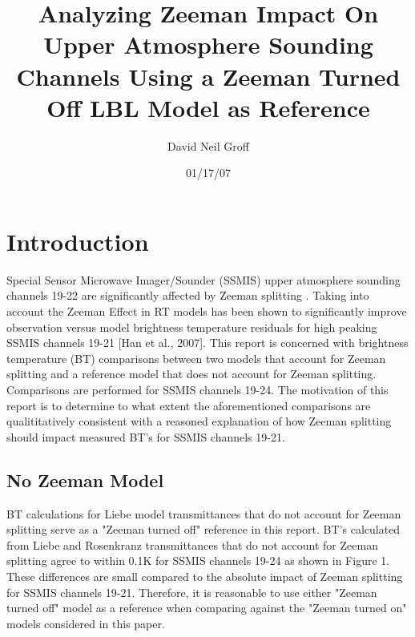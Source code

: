

\title{Analyzing Zeeman Impact On Upper Atmosphere Sounding Channels Using a Zeeman Turned Off LBL Model as Reference}
\author{David Neil Groff}
\date{01/17/07}

\newcommand{\microtesla}{\ensuremath{\mu\textrm{T}}}

\maketitle

\section{Introduction}
Special Sensor Microwave Imager/Sounder (SSMIS) upper atmosphere sounding channels 19-22 are significantly affected
by Zeeman splitting \cite{ref:Han1}. Taking into account the Zeeman Effect in RT models has been
shown to significantly improve observation versus model brightness temperature
residuals for high peaking SSMIS channels 19-21 [Han et al., 2007].
This report is concerned with brightness temperature (BT) comparisons between two models that
account for Zeeman splitting and a reference model
that does not account for Zeeman splitting. Comparisons are performed for SSMIS channels 19-24.
The motivation of this report is to 
determine to what extent the aforementioned comparisons
are qualititatively consistent with a reasoned explanation of how Zeeman splitting 
should impact measured BT's for SSMIS channels 19-21.
    
\subsection{No Zeeman Model}
BT calculations for Liebe model transmittances that do not account for Zeeman splitting serve
as a "Zeeman turned off" reference in this report. BT's calculated from Liebe and
Rosenkranz transmittances that do not account for Zeeman splitting agree to within 0.1K for SSMIS channels 19-24 as shown in Figure 1.  
These differences are small compared to the absolute impact of Zeeman splitting for SSMIS channels 19-21. Therefore, it is reasonable to use
either "Zeeman turned off" model as a reference when comparing against the "Zeeman turned on"
models considered in this paper. 

